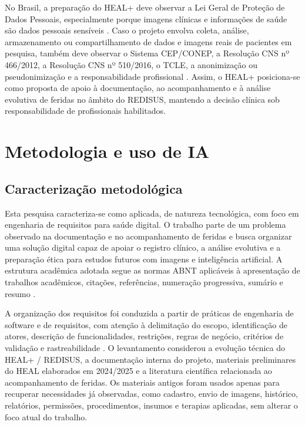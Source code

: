 \documentclass[
    12pt,
    oneside,
    a4paper,
    chapter=TITLE,
    brazil,
    sumario=tradicional,
    hidelinks
]{abntex2}
\begin{document}
No Brasil, a preparação do HEAL+ deve observar a Lei Geral de Proteção de Dados Pessoais, especialmente porque imagens clínicas e informações de saúde são dados pessoais sensíveis \cite{brasil2018,anpd2023}. Caso o projeto envolva coleta, análise, armazenamento ou compartilhamento de dados e imagens reais de pacientes em pesquisa, também deve observar o Sistema CEP/CONEP, a Resolução CNS nº 466/2012, a Resolução CNS nº 510/2016, o TCLE, a anonimização ou pseudonimização e a responsabilidade profissional \cite{brasil2012,brasil2016}. Assim, o HEAL+ posiciona-se como proposta de apoio à documentação, ao acompanhamento e à análise evolutiva de feridas no âmbito do REDISUS, mantendo a decisão clínica sob responsabilidade de profissionais habilitados.

\chapter{Metodologia e uso de IA}

\section{Caracterização metodológica}

Esta pesquisa caracteriza-se como aplicada, de natureza tecnológica, com foco em engenharia de requisitos para saúde digital. O trabalho parte de um problema observado na documentação e no acompanhamento de feridas e busca organizar uma solução digital capaz de apoiar o registro clínico, a análise evolutiva e a preparação ética para estudos futuros com imagens e inteligência artificial. A estrutura acadêmica adotada segue as normas ABNT aplicáveis à apresentação de trabalhos acadêmicos, citações, referências, numeração progressiva, sumário e resumo \cite{abnt14724,abnt10520,abnt6023,abnt6024,abnt6027,abnt6028}.

A organização dos requisitos foi conduzida a partir de práticas de engenharia de software e de requisitos, com atenção à delimitação do escopo, identificação de atores, descrição de funcionalidades, restrições, regras de negócio, critérios de validação e rastreabilidade \cite{fernandes2017,pressman2016}. O levantamento considerou a evolução técnica do HEAL+ / REDISUS, a documentação interna do projeto, materiais preliminares do HEAL elaborados em 2024/2025 e a literatura científica relacionada ao acompanhamento de feridas. Os materiais antigos foram usados apenas para recuperar necessidades já observadas, como cadastro, envio de imagens, histórico, relatórios, permissões, procedimentos, insumos e terapias aplicadas, sem alterar o foco atual do trabalho.
\end{document}
